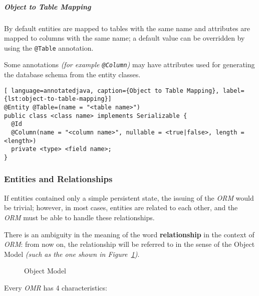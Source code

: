 \documentclass[english]{article}
\begin{document}
\subparagraph*{Object to Table Mapping}
By default entities are mapped to tables with the same name and attributes are mapped to columns with the same name;
a default value can be overridden by using the \texttt{@Table} annotation.

Some annotations \textit{(for example \texttt{@Column})} may have attributes used for generating the database schema from the entity classes.

\begin{lstlisting}[ language=annotatedjava, caption={Object to Table Mapping}, label={lst:object-to-table-mapping}]
@Entity @Table=(name = "<table name>")
public class <class name> implements Serializable {
  @Id
  @Column(name = "<column name>", nullable = <true|false>, length = <length>)
  private <type> <field name>;
}
\end{lstlisting}

\subsubsection{Entities and Relationships}

If entities contained only a simple persistent state, the issuing of the \textit{ORM} would be trivial;
however, in most cases, entities are related to each other, and the \textit{ORM} must be able to handle these relationships.

There is an ambiguity in the meaning of the word \textbf{relationship} in the context of \textit{ORM}:
from now on, the relationship will be referred to in the sense of the Object Model \textit{(such as the one shown in Figure~\ref{fig:object-model})}.

\begin{figure}[htbp]
  \centering
  \bigskip
  \bigskip
  \caption{Object Model}
  \label{fig:object-model}
\end{figure}

Every \textit{OMR} has 4 characteristics:
\end{document}
